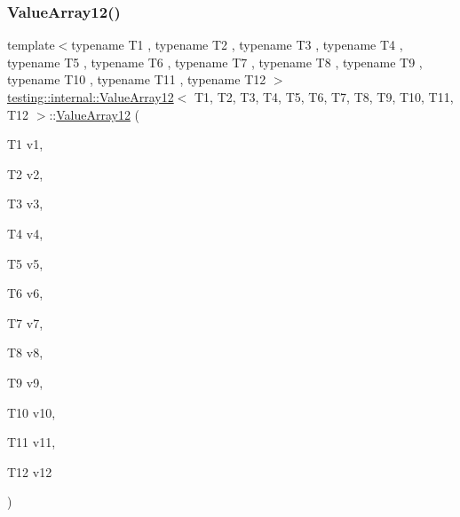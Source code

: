\subsubsection{\texorpdfstring{ValueArray12()}{ValueArray12()}\hspace{0.1cm}{\footnotesize\ttfamily [1/2]}}
{\footnotesize\ttfamily template$<$typename T1 , typename T2 , typename T3 , typename T4 , typename T5 , typename T6 , typename T7 , typename T8 , typename T9 , typename T10 , typename T11 , typename T12 $>$ \\
\mbox{\hyperlink{classtesting_1_1internal_1_1ValueArray12}{testing\+::internal\+::\+Value\+Array12}}$<$ T1, T2, T3, T4, T5, T6, T7, T8, T9, T10, T11, T12 $>$\+::\mbox{\hyperlink{classtesting_1_1internal_1_1ValueArray12}{Value\+Array12}} (\begin{DoxyParamCaption}\item[{T1}]{v1,  }\item[{T2}]{v2,  }\item[{T3}]{v3,  }\item[{T4}]{v4,  }\item[{T5}]{v5,  }\item[{T6}]{v6,  }\item[{T7}]{v7,  }\item[{T8}]{v8,  }\item[{T9}]{v9,  }\item[{T10}]{v10,  }\item[{T11}]{v11,  }\item[{T12}]{v12 }\end{DoxyParamCaption})\hspace{0.3cm}{\ttfamily [inline]}}

\mbox{\label{classtesting_1_1internal_1_1ValueArray12_a901c95791c3b16ca51fcd7fc1323fef2}} 
